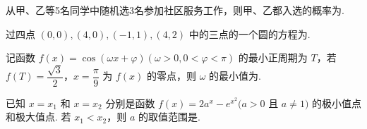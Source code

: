 \documentclass[a4paper,11pt]{report}
\begin{document}
\begin{examquestions}[start=13]
\item 从甲、乙等5名同学中随机选3名参加社区服务工作，则甲、乙都入选的概率为\blank. 
\item 过四点 $(0,0),(4,0),(-1,1),(4,2)$ 中的三点的一个圆的方程为\blank. 
\item 记函数 $f(x)=\cos(\omega x+\varphi)(\omega>0,0<\varphi<\pi)$ 的最小正周期为 $T$，若 $f(T)=\dfrac{\sqrt3}{2}$，$x=\dfrac\pi9$ 为 $f(x)$ 的零点，则 $\omega$ 的最小值为\blank. 
\item 已知 $x=x_1$ 和 $x=x_2$ 分别是函数 $f(x)=2a^x-e^{x^2}(a>0$ 且 $a\neq1)$ 的极小值点和极大值点. 若 $x_1<x_2$，则 $a$ 的取值范围是\blank. 
\end{examquestions}
\end{document}
